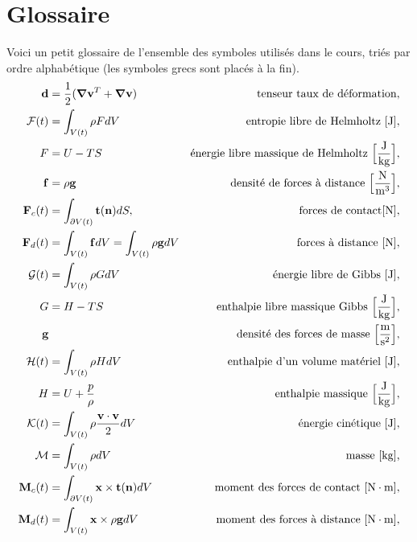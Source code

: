 
\chapter{Glossaire}
  Voici un petit glossaire de l'ensemble des symboles utilisés dans le cours, triés par ordre alphabétique (les symboles grecs sont placés à la fin).
  \begingroup
  \allowdisplaybreaks
  \begin{align*}
    \vb{d} &= \frac{1}{2}(\grad\vb{v}^T + \grad\vb{v}) & \textrm{tenseur taux de déformation},\\
    \mathcal{F}(t) &= \int_{V(t)} \rho F dV & \textrm{entropie libre de Helmholtz } [\si{J}],\\
    F &= U - TS & \textrm{énergie libre massique de Helmholtz } \Big[\si{\frac{J}{kg}}\Big],\\
    \vb{f} &= \rho \vb{g} & \textrm{densité de forces à distance } \Big[\si{\frac{N}{m^3}}\Big], \\
    \mathcal{\vb{F}}_c (t) &= \int_{\partial V(t)} \vb{t}(\vb{n}) dS, & \textrm{forces de contact} [\si{N}],\\
    \mathcal{\vb{F}}_d (t) &= \int_{V(t)} \vb{f} dV = \int_{V(t)} \rho \vb{g} dV & \textrm{forces à distance } [\si{N}],\\
    \mathcal{G}(t) &= \int_{V(t)} \rho G dV & \textrm{énergie libre de Gibbs } [\si{J}],\\
    G &= H -TS & \textrm{enthalpie libre massique Gibbs } \Big[\si{\frac{J}{kg}}\Big],\\
    \vb{g} & & \textrm {densité des forces de masse } \Big[\si{\frac{m}{s^2}}\Big],\\
    \mathcal{H}(t) &= \int_{V(t)} \rho H dV & \textrm{enthalpie d'un volume matériel } [\si{J}],\\
    H &= U + \frac{p}{\rho} & \textrm{enthalpie massique } \Big[\si{\frac{J}{kg}}\Big],\\
    \mathcal{K}(t) &= \int_{V(t)} \rho \frac{\vb{v}\cdot\vb{v}}{2} dV & \textrm{énergie cinétique } [\si{J}],\\
    \mathcal{M} & = \int_{V(t)} \rho dV  & \textrm{masse [\si{kg}],}\\
    \mathcal{\vb{M}}_c (t) &= \int_{\partial V(t)} \vb{x} \times \vb{t}(\vb{n}) dV & \textrm{moment des forces de contact } [\si{N \cdot m}],\\
    \mathcal{\vb{M}}_d (t) &= \int_{V(t)} \vb{x} \times \rho \vb{g} dV & \textrm{moment des forces à distance } [\si{N \cdot m}],\\

\end{align*}
